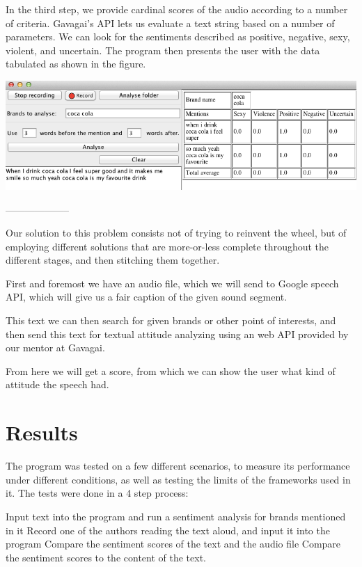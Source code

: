 \documentclass[a4paper,12pt,twoside]{ltxdoc}
\begin{document}
In the third step, we provide cardinal scores of the audio according to a number of criteria. Gavagai's API lets us
evaluate a text string based on a number of parameters. We can look for the sentiments described as positive, negative, sexy, violent,
and uncertain. The program then presents the user with the data tabulated as shown in the figure. %

\begin{center}
\includegraphics[scale=0.6]{../poster/screenshot_crop.png}
\end{center}

--------------------

Our solution to this problem consists not of trying to reinvent the wheel, but of employing different
solutions that are more-or-less complete throughout the different stages, and then stitching them together.

First and foremost we have an audio file, which we will send to Google speech API, which will give us a fair caption of the given sound segment.

This text we can then search for given brands or other point of interests, and then send this text for textual attitude analyzing using an web API provided by our mentor at Gavagai.

From here we will get a score, from which we can show the user what kind of attitude the speech had. 

\section{Results}
The program was tested on a few different scenarios, to measure its performance under different conditions, as well as testing the limits of the frameworks used in it. The tests were done in a 4 step process:

Input text into the program and run a sentiment analysis for brands mentioned in it
Record one of the authors reading the text aloud, and input it into the program
Compare the sentiment scores of the text and the audio file
Compare the sentiment scores to the content of the text.
\end{document}
